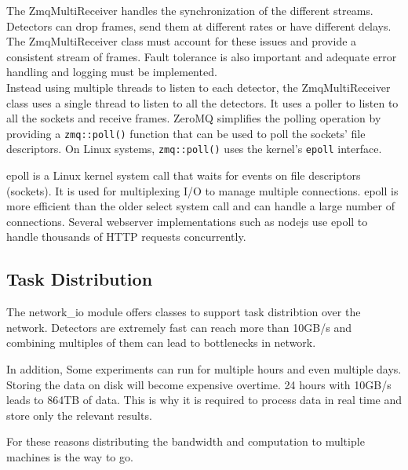\documentclass[./chapitre3.tex]{subfiles}
\begin{document}
The ZmqMultiReceiver handles the synchronization of the different streams. Detectors can drop
frames, send them at different rates or have different delays. The ZmqMultiReceiver class
must account for these issues and provide a consistent stream of frames. Fault tolerance is also
important and adequate error handling and logging must be implemented.\\

Instead using multiple threads to listen to each detector, the ZmqMultiReceiver class uses a single
thread to listen to all the detectors. It uses a poller to listen to all the sockets and receive
frames. ZeroMQ simplifies the polling operation by providing a \lstinline|zmq::poll()|
function that can be used to poll the sockets' file descriptors. On Linux systems,
\lstinline|zmq::poll()| uses the kernel's \lstinline|epoll| interface.

epoll is a Linux kernel system call that waits for events on file descriptors (sockets). It is used for
multiplexing I/O to manage multiple connections. epoll is more efficient than the older select system call
and can handle a large number of connections. Several webserver implementations such as nodejs use epoll to handle
thousands of HTTP requests concurrently. \cite{gammo2004comparing, marathe2015introduction}\\

\subsection{Task Distribution}
The network\_io module offers classes to support task distribtion over the network.
Detectors are extremely fast can reach more than 10GB/s and combining multiples of them
can lead to bottlenecks in network.

In addition, Some experiments
can run for multiple hours and even multiple days. Storing the data on disk will become expensive
overtime. 24 hours with 10GB/s leads to 864TB of data. This is why it is required to
process data in real time and store only the relevant results.

For these reasons distributing the bandwidth and computation to multiple machines
is the way to go.\\
\end{document}
